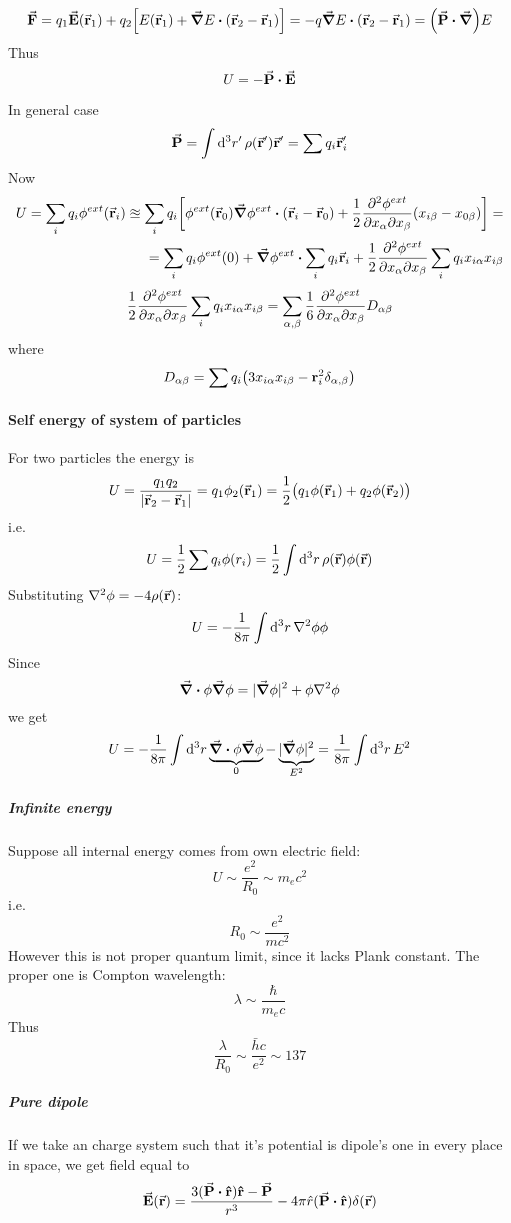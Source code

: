 $$\va{F} = q_1 \va{E}(\va{r}_1) + q_2 \qty[E(\va{r}_1) + \grad{E} \vdot (\va{r}_2 - \va{r}_1)] = -q \grad{E} \vdot (\va{r}_2 - \va{r}_1) = \qty(\va{P} \vdot \grad){E}$$
Thus 
$$U = -\va{P} \vdot \va{E}$$

In general case
$$\va{P}  = \int \dd[3]{r'} \rho(\va{r}') \va{r}' = \sum q_i \va{r}'_i$$
Now
\begin{align*}
U = \sum_i q_i \phi^{ext} (\va{r}_i) \approxeq \sum_i q_i \qty[\phi^{ext}(\va{r}_0) \grad{\phi^{ext}} \vdot (\va{r}_i -\va{r}_0) + \frac{1}{2} \pdv{\phi^{ext}}{x_\alpha}{x_\beta} (x_{i\alpha} - x_{0\alpha})(x_{i\beta} - x_{0\beta})] =\\= \sum_i q_i \phi^{ext}(0) + \grad{\phi^{ext}} \vdot \sum_i q_i\va{r}_i + \frac{1}{2} \pdv{\phi^{ext}}{x_\alpha}{x_\beta} \sum_i q_i x_{i\alpha} x_{i\beta}
\end{align*}
$$ \frac{1}{2} \pdv{\phi^{ext}}{x_\alpha}{x_\beta} \sum_i q_i x_{i\alpha} x_{i\beta} = \sum_{\alpha, \beta} \frac{1}{6} \pdv{\phi^{ext}}{x_\alpha}{x_\beta} D_{\alpha \beta}$$
where
$$D_{\alpha \beta} = \sum q_i \qty( 3x_{i\alpha}x_{i\beta} - \vb{r}_i^2 \delta_{\alpha, \beta})$$
\paragraph{Self energy of system of particles}
For two particles the energy is
$$U = \frac{q_1q_2}{\qty|\va{r}_2 - \va{r}_1|} = q_1 \phi_2(\va{r}_1)  = \frac{1}{2} \qty\big(q_1\phi(\va{r}_1)+q_2\phi(\va{r}_2))$$
i.e.
$$U = \frac{1}{2} \sum q_i \phi(r_i) = \frac{1}{2} \int \dd[3]{r} \rho(\va{r}) \phi(\va{r}) $$
Substituting $\laplacian{\phi} = -4\rho(\va{r})$:
$$U = -\frac{1}{8\pi} \int \dd[3]{r} \laplacian{\phi} \phi$$
Since
$$\div{\phi \grad{\phi} } = |\grad \phi|^2 + \phi \laplacian{\phi}$$
we get
$$U = -\frac{1}{8\pi}\int \dd[3]{r} \underbrace{\div{\phi \grad{\phi}}}_0 - \underbrace{|\grad \phi|^2}_{E^2} = \frac{1}{8\pi}\int \dd[3]{r} E^2$$
\subparagraph{Infinite energy}
Suppose all internal energy comes from own electric field:
$$U \sim \frac{e^2}{R_0} \sim m_e c^2$$
i.e.
$$R_0 \sim \frac{e^2}{mc^2}$$
However this is not proper quantum limit, since it lacks Plank constant. The proper one is Compton wavelength:
$$\lambda \sim \frac{\hbar}{m_e c}$$
Thus
$$\frac{\lambda}{R_0} \sim \frac{\bar{h} c}{e^2} \sim 137$$
\subparagraph{Pure dipole}
If we take an charge system such that it's potential is dipole's one in every place in space, we get field equal to
$$\va{E}(\va{r}) = \frac{3(\va{P} \vdot \vu{r}) \vu{r} - \va{P}}{r^3} - 4\pi \hat{r} (\va{P} \vdot \vu{r}) \delta(\va{r})$$
